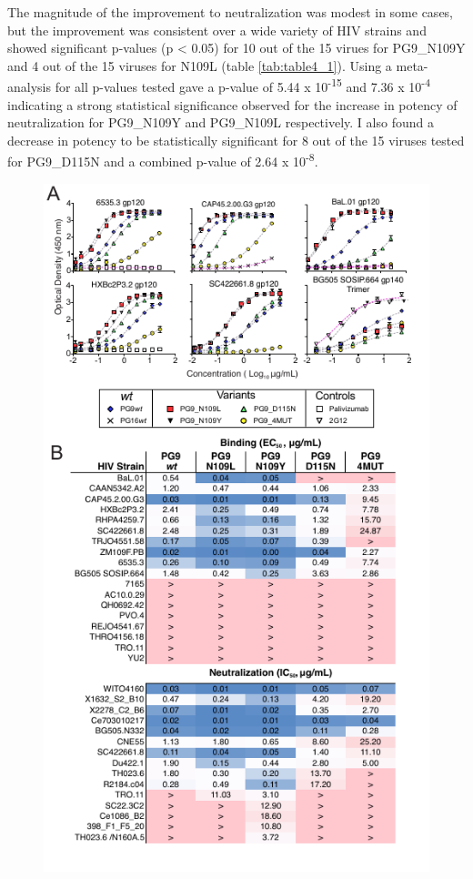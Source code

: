 The magnitude of the improvement to neutralization was modest in some cases, but the improvement was consistent over a wide variety of HIV strains and showed significant p-values (p < 0.05) for 10 out of the 15 virues for PG9\_N109Y and 4 out of the 15 viruses for N109L (table \ref{tab:table4_1}). Using a meta-analysis for all p-values tested gave a p-value of 5.44 x 10\textsuperscript{-15} and 7.36 x 10\textsuperscript{-4} indicating a strong statistical significance observed for the increase in potency of neutralization for PG9\_N109Y and PG9\_N109L respectively. I also found a decrease in potency to be statistically significant for 8 out of the 15 viruses tested for PG9\_D115N and a combined p-value of 2.64 x 10\textsuperscript{-8}.


\begin{figure}[!t]
   \centering
   \includegraphics{images/chapter4/figure4_4.pdf} %

\end{figure}
